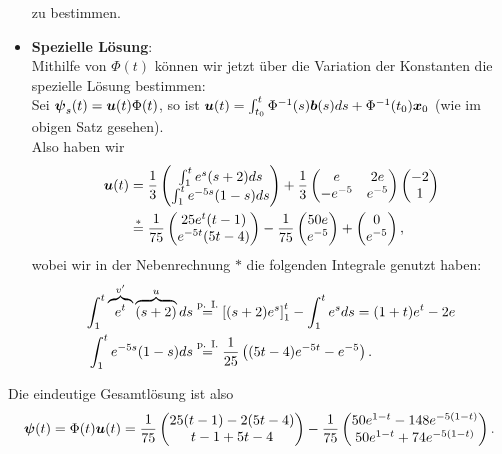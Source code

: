 \begin{Beispiel}
\begin{itemize}
\begin{equation*}
    \end{equation*}
    zu bestimmen.
    \item \textbf{Spezielle Lösung}:\\
    Mithilfe von $\Phi(t)$ können wir jetzt über die Variation der Konstanten die spezielle Lösung bestimmen:\\
    Sei ${{\text{\boldmath${\psi}$}}}_s(t)={{\text{\boldmath${u}$}}}(t)\Phi(t)$, so ist ${{\text{\boldmath${u}$}}}(t)=\int_{t_0}^t\Phi^{-1}(s){{\text{\boldmath${b}$}}}(s)ds+\Phi^{-1}(t_0){{\text{\boldmath${x}$}}}_0$ (wie im obigen Satz gesehen).\\
    Also haben wir
    \begin{align*}
        {{\text{\boldmath${u}$}}}(t)&=\frac{1}{3}\begin{pmatrix}\int_1^te^s(s+2)ds\\\int_{1}^te^{-5s}(1-s)ds\end{pmatrix}+\frac{1}{3}\begin{pmatrix}e&2e\\-e^{-5}&e^{-5}\end{pmatrix}\begin{pmatrix}-2\\1\end{pmatrix}\\
        &\overset{*}{=}\frac{1}{75}\begin{pmatrix}25e^t(t-1)\\e^{-5t}(5t-4)\end{pmatrix}-\frac{1}{75}\begin{pmatrix}50e\\e^{-5}\end{pmatrix}+\begin{pmatrix}0\\e^{-5}\end{pmatrix},
    \end{align*}
    wobei wir in der Nebenrechnung $*$ die folgenden Integrale genutzt haben:
    \begin{align*}
        \int_1^t\overbrace{e^t}^{v'}\overbrace{(s+2)}^uds&\overset{\text{p. I.}}{=}\left[{(s+2)e^s}\right]_1^t-\int_1^te^sds=(1+t)e^t-2e\\
        \int_1^te^{-5s}(1-s)ds&\overset{\text{p. I.}}{=}\frac{1}{25}\left({(5t-4)e^{-5t}-e^{-5}}\right).
    \end{align*}
\end{itemize}
Die eindeutige Gesamtlösung ist also
\begin{equation*}
    {{\text{\boldmath${\psi}$}}}(t)=\Phi(t){{\text{\boldmath${u}$}}}(t)=\frac{1}{75}\begin{pmatrix}25(t-1)-2(5t-4)\\t-1+5t-4\end{pmatrix}-\frac{1}{75}\begin{pmatrix}50e^{1-t}-148e^{-5(1-t)}\\50e^{1-t}+74e^{-5(1-t)}\end{pmatrix}.
\end{equation*}
\end{Beispiel}
